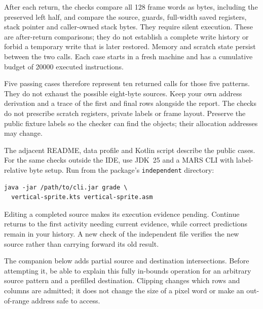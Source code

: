 After each return, the checks compare all 128 frame words as bytes, including the
preserved left half, and compare the source, guards, full-width saved registers,
stack pointer and caller-owned stack bytes. They require silent execution. These
are after-return comparisons; they do not establish a complete write history or
forbid a temporary write that is later restored. Memory and scratch state persist
between the two calls. Each case starts in a fresh machine and has a cumulative
budget of 20000 executed instructions.

Five passing cases therefore represent ten returned calls for those five
patterns. They do not exhaust the possible eight-byte sources. Keep your own
address derivation and a trace of the first and final rows alongside the report.
The checks do not prescribe scratch registers, private labels or frame layout.
Preserve the public fixture labels so the checker can find the objects; their
allocation addresses may change.

The adjacent README, data profile and Kotlin script describe the public cases.
For the same checks outside the IDE, use JDK~25 and a MARS CLI with label-relative
byte setup. Run from the package's \texttt{independent} directory:

\begin{verbatim}
java -jar /path/to/cli.jar grade \
  vertical-sprite.kts vertical-sprite.asm
\end{verbatim}

Editing a completed source makes its execution evidence pending. Continue
returns to the first activity needing current evidence, while correct predictions
remain in your history. A new check of the independent file verifies the new
source rather than carrying forward its old result.

The companion below adds partial source and destination intersections.
Before attempting it, be able to explain this fully in-bounds operation for an
arbitrary source pattern and a prefilled destination. Clipping changes which
rows and columns are admitted; it does not change the size of a pixel word or
make an out-of-range address safe to access.


